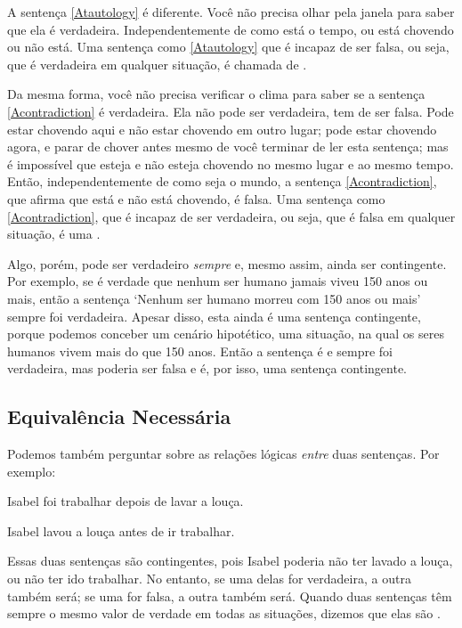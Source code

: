 A sentença \ref{Atautology} é diferente.
Você não precisa olhar pela janela para saber que ela é verdadeira. Independentemente de como está o tempo, ou está chovendo ou não está.
Uma sentença como \ref{Atautology} que é incapaz de ser falsa, ou seja, que é verdadeira em qualquer situação, é chamada de .

Da mesma forma, você não precisa verificar o clima para saber se a sentença \ref{Acontradiction} é verdadeira.
Ela não pode ser verdadeira, tem de ser falsa.
Pode estar chovendo aqui e não estar chovendo em outro lugar; pode estar chovendo agora, e parar de chover antes mesmo de você terminar de ler esta sentença; mas é impossível que esteja e não esteja chovendo no mesmo lugar e ao mesmo tempo.
Então, independentemente de como seja o mundo, a sentença \ref{Acontradiction}, que afirma que está e não está chovendo, é falsa.
Uma sentença como \ref{Acontradiction}, que é incapaz de ser verdadeira, ou seja, que é falsa em qualquer situação, é uma .

Algo, porém, pode ser verdadeiro \emph{sempre} e, mesmo assim, ainda ser contingente. Por exemplo, se é verdade que nenhum ser humano jamais viveu 150 anos ou mais, então a sentença `Nenhum ser humano morreu com 150 anos ou mais' sempre foi verdadeira.
Apesar disso, esta ainda é uma sentença contingente, porque podemos conceber um cenário hipotético, uma situação, na qual os seres humanos vivem mais do que 150 anos.
Então a sentença é e sempre foi verdadeira, mas poderia ser falsa e é, por isso, uma sentença contingente.

\subsection{Equivalência Necessária}

Podemos também perguntar sobre as relações lógicas \emph{entre} duas sentenças.
Por exemplo:
\begin{earg}
\item[] Isabel foi trabalhar depois de lavar a louça.
\item[] Isabel lavou a louça antes de ir trabalhar.
\end{earg}
Essas duas sentenças são contingentes, pois Isabel poderia não ter lavado a louça, ou não ter ido trabalhar.
No entanto, se uma delas for verdadeira, a outra também será; se uma for falsa, a outra também será.
Quando duas sentenças têm sempre o mesmo valor de verdade em todas as situações, dizemos que elas são .

